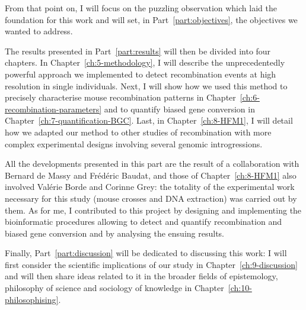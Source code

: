From that point on, I will focus on the puzzling observation which laid the foundation for this work and will set, in Part~\ref{part:objectives}, the objectives we wanted to address.


The results presented in Part~\ref{part:results} will then be divided into four chapters.
In Chapter~\ref{ch:5-methodology}, I will describe the unprecedentedly powerful approach we implemented to detect recombination events at high resolution in single individuals.
Next, I will show how we used this method to precisely characterise mouse recombination patterns in Chapter~\ref{ch:6-recombination-parameters} and to quantify biased gene conversion in Chapter~\ref{ch:7-quantification-BGC}.
Last, in Chapter~\ref{ch:8-HFM1}, I will detail how we adapted our method to other studies of recombination with more complex experimental designs involving several genomic introgressions.
\begin{mccorrection}
	All the developments presented in this part are the result of a collaboration with Bernard de Massy and Frédéric Baudat, and those of Chapter~\ref{ch:8-HFM1} also involved Valérie Borde and Corinne Grey: the totality of the experimental work necessary for this study (mouse crosses and DNA extraction) was carried out by them.
	As for me, I contributed to this project by designing and implementing the bioinformatic procedures allowing to detect and quantify recombination and biased gene conversion and by analysing the ensuing results.
\end{mccorrection}

Finally, Part~\ref{part:discussion} will be dedicated to discussing this work: I will first consider the scientific implications of our study in Chapter~\ref{ch:9-discussion} and will then share ideas related to it in the broader fields of epistemology, philosophy of science and sociology of knowledge in Chapter~\ref{ch:10-philosophising}.










